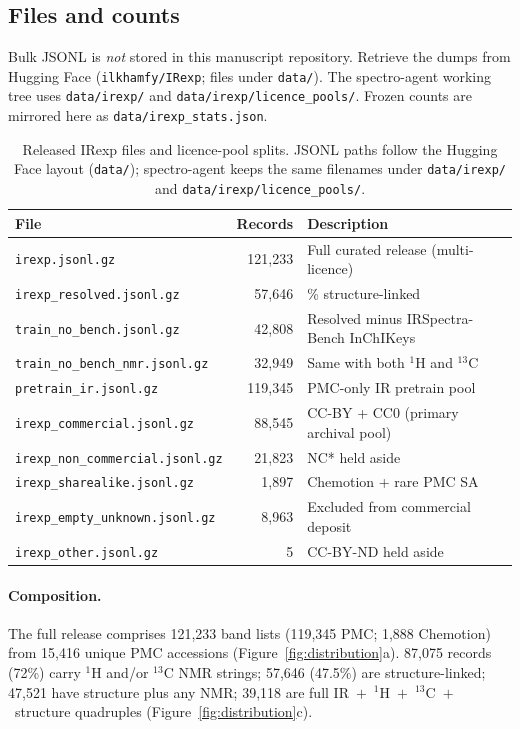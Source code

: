 \documentclass[pdflatex,sn-nature]{sn-jnl}
\begin{document}
\subsection{Files and counts}

Bulk JSONL is \emph{not} stored in this manuscript repository.
Retrieve the dumps from Hugging Face (\texttt{ilkhamfy/IRexp}; files under
\texttt{data/}).
The spectro-agent working tree uses \texttt{data/irexp/} and
\texttt{data/irexp/licence\_pools/}.
Frozen counts are mirrored here as \texttt{data/irexp\_stats.json}.

\begin{table}[ht]
\caption{Released IRexp files and licence-pool splits.
JSONL paths follow the Hugging Face layout (\texttt{data/});
spectro-agent keeps the same filenames under \texttt{data/irexp/}
and \texttt{data/irexp/licence\_pools/}.}\label{tab:files}
\scriptsize
\begin{tabular}{@{}>{\raggedright\arraybackslash}p{5.6cm}r
  >{\raggedright\arraybackslash}p{5.2cm}@{}}
\toprule
File & Records & Description \\
\midrule
\texttt{irexp.jsonl.gz} & 121,233 & Full curated release (multi-licence) \\
\texttt{irexp\_resolved.jsonl.gz} & 57,646 & 100\% structure-linked \\
\texttt{train\_no\_bench.jsonl.gz} & 42,808 & Resolved minus IRSpectra-Bench InChIKeys \\
\texttt{train\_no\_bench\_nmr.jsonl.gz} & 32,949 & Same with both $^{1}$H and $^{13}$C \\
\texttt{pretrain\_ir.jsonl.gz} & 119,345 & PMC-only IR pretrain pool \\
\midrule
\texttt{irexp\_commercial.jsonl.gz} & 88,545 & CC-BY + CC0 (primary archival pool) \\
\texttt{irexp\_non\_commercial.jsonl.gz} & 21,823 & NC* held aside \\
\texttt{irexp\_sharealike.jsonl.gz} & 1,897 & Chemotion + rare PMC SA \\
\texttt{irexp\_empty\_unknown.jsonl.gz} & 8,963 & Excluded from commercial deposit \\
\texttt{irexp\_other.jsonl.gz} & 5 & CC-BY-ND held aside \\
\bottomrule
\end{tabular}
\end{table}


\paragraph{Composition.}
The full release comprises 121,233 band lists (119,345 PMC; 1,888 Chemotion)
from 15,416 unique PMC accessions
(Figure~\ref{fig:distribution}a).
87,075 records (72\%) carry $^{1}$H and/or $^{13}$C NMR strings; 57,646 (47.5\%)
are structure-linked; 47,521 have structure plus any NMR; 39,118 are full
IR~$+$~$^{1}$H~$+$~$^{13}$C~$+$~structure quadruples
(Figure~\ref{fig:distribution}c).
\end{document}
